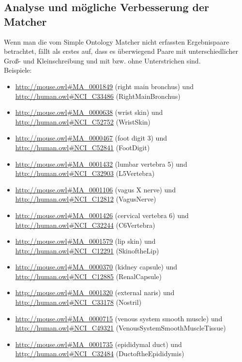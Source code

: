 		\subsection{Analyse und mögliche Verbesserung der Matcher}
		Wenn man die vom Simple Ontology Matcher nicht erfassten Ergebnispaare
		betrachtet, fällt als erstes auf, dass es überwiegend Paare mit
		unterschiedlicher Groß- und Kleinschreibung und mit bzw. ohne Unterstrichen
		sind.\\
		Beispiele:
		\begin{itemize}
		\item \url{http://mouse.owl#MA_0001849} (right main bronchus) und \url{http://human.owl#NCI_C33486} (Right\textunderscore Main\textunderscore Bronchus)
		\item \url{http://mouse.owl#MA_0000638} (wrist skin) und \url{http://human.owl#NCI_C52752} (Wrist\textunderscore Skin)
		\item \url{http://mouse.owl#MA_0000467} (foot digit 3) und \url{http://human.owl#NCI_C52841} (Foot\textunderscore Digit)
		\item \url{http://mouse.owl#MA_0001432} (lumbar vertebra 5) und \url{http://human.owl#NCI_C32903} (L5\textunderscore Vertebra)
		\item \url{http://mouse.owl#MA_0001106} (vagus X nerve) und \url{http://human.owl#NCI_C12812} (Vagus\textunderscore Nerve)
		\item \url{http://mouse.owl#MA_0001426} (cervical vertebra 6) und \url{http://human.owl#NCI_C32244} (C6\textunderscore Vertebra)
		\item \url{http://mouse.owl#MA_0001579} (lip skin) und \url{http://human.owl#NCI_C12291} (Skin\textunderscore of\textunderscore the\textunderscore Lip)
		\item \url{http://mouse.owl#MA_0000370} (kidney capsule) und \url{http://human.owl#NCI_C12885} (Renal\textunderscore Capsule)
		\item \url{http://mouse.owl#MA_0001320} (external naris) und \url{http://human.owl#NCI_C33178} (Nostril)
		\item \url{http://mouse.owl#MA_0000715} (venous system smooth muscle) und \url{http://human.owl#NCI_C49321} (Venous\textunderscore System\textunderscore Smooth\textunderscore Muscle\textunderscore Tissue)
		\item \url{http://mouse.owl#MA_0001735} (epididymal duct) und \url{http://human.owl#NCI_C32484} (Duct\textunderscore of\textunderscore the\textunderscore Epididymis)
		\end{itemize}
		
